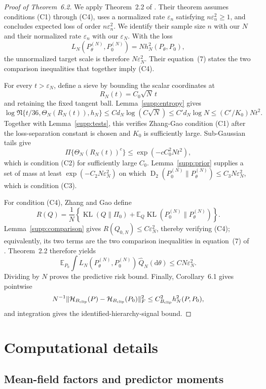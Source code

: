 \documentclass[
  12pt]{article}
\theoremstyle{definition}
\theoremstyle{plain}
\newcommand{\E}{\mathbb E}
\newcommand{\KL}{\operatorname{KL}}
\newcommand{\Renyi}{\operatorname{D}_{2}}
\newcommand{\dd}{\mathrm d}
\newcommand{\eps}{\varepsilon}
\newcommand{\cover}{\mathfrak N}
\begin{document}
\begin{proof}[Proof of Theorem~6.2]
	We apply Theorem~2.2 of \citet{zhang_2020_ConvergenceRatesVariational}. Their theorem assumes conditions (C1) through (C4), uses a normalized rate $\varepsilon_n$ satisfying $n\varepsilon_n^2\ge1$, and concludes expected loss of order $n\varepsilon_n^2$. We identify their sample size $n$ with our $N$ and their normalized rate $\varepsilon_n$ with our $\eps_N$. With the loss
	\[
	L_N(P_\theta^{(N)},P_0^{(N)})=Nh_N^2(P_\theta,P_0),
	\]
	the unnormalized target scale is therefore $N\eps_N^2$. Their equation~(7) states the two comparison inequalities that together imply (C4).
	
	For every $t>\eps_N$, define a sieve by bounding the scalar coordinates at
	\[
	R_N(t)=C_0\sqrt N\,t
	\]
	and retaining the fixed tangent ball. Lemma~\ref{supp:entropy} gives
	\[
	\log\cover\{t/36,\Theta_N(R_N(t)),h_N\}
	\le Cd_N\log(C\sqrt N)
	\le C'd_N\log N
	\le (C'/K_0)Nt^2.
	\]
	Together with Lemma~\ref{supp:tests}, this verifies Zhang-Gao condition (C1) after the loss-separation constant is chosen and $K_0$ is sufficiently large. Sub-Gaussian tails give
	\[
	\Pi\{\Theta_N(R_N(t))^c\}\le\exp(-cC_0^2Nt^2),
	\]
	which is condition (C2) for sufficiently large $C_0$. Lemma~\ref{supp:prior} supplies a set of mass at least $\exp(-C_2N\eps_N^2)$ on which $\Renyi(P_0^{(N)}\|P_\theta^{(N)})\le C_3N\eps_N^2$, which is condition (C3).
	
	For condition (C4), Zhang and Gao define
	\[
	R(Q)=\frac1N\left\{\KL(Q\|\Pi_0)+\E_Q\KL(P_0^{(N)}\|P_\theta^{(N)})\right\}.
	\]
	Lemma~\ref{supp:comparison} gives $R(Q_{0,N})\le C\eps_N^2$, thereby verifying (C4); equivalently, its two terms are the two comparison inequalities in equation~(7) of \citet{zhang_2020_ConvergenceRatesVariational}. Theorem~2.2 therefore yields
	\[
	\E_{P_0}\int L_N(P_\theta^{(N)},P_0^{(N)})\,\widehat Q_N(\dd\theta)
	\le C N\eps_N^2.
	\]
	Dividing by $N$ proves the predictive risk bound. Finally, Corollary~6.1 gives pointwise
	\[
	N^{-1}\|\mathcal H_{B_{\rm clip}}(P)-\mathcal H_{B_{\rm clip}}(P_0)\|_F^2
	\le C_{B_{\rm clip}}^2h_N^2(P,P_0),
	\]
	and integration gives the identified-hierarchy-signal bound.
\end{proof}

\section{Computational details}
\label{supp:computation}

\subsection{Mean-field factors and predictor moments}
\end{document}
